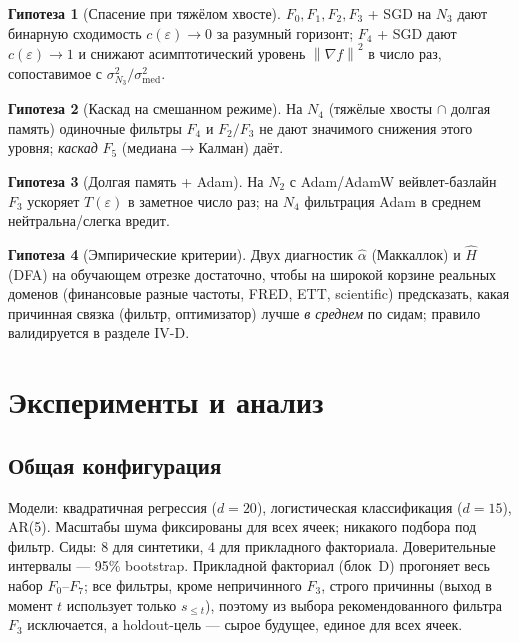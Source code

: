 \documentclass[conference]{IEEEtran}
\theoremstyle{plain}
\theoremstyle{definition}
\newtheorem{hypothesis}{Гипотеза}
\newcommand{\norm}[1]{\left\lVert#1\right\rVert}
\begin{document}
\begin{hypothesis}[Спасение при тяжёлом хвосте]\label{hyp:rescue}
$F_0,F_1,F_2,F_3$ + SGD на $N_3$ дают бинарную сходимость
$c(\varepsilon)\to0$ за разумный горизонт; $F_4$ + SGD дают
$c(\varepsilon)\to1$ и снижают асимптотический уровень $\norm{\nabla f}^2$ в число раз,
сопоставимое с $\sigma_{N_3}^2/\sigma_{\mathrm{med}}^2$.
\end{hypothesis}

\begin{hypothesis}[Каскад на смешанном режиме]\label{hyp:cascade}
На $N_4$ (тяжёлые хвосты $\cap$ долгая память) одиночные фильтры $F_4$
и $F_2/F_3$ не дают значимого снижения этого уровня; \emph{каскад} $F_5$
(медиана$\to$Калман) даёт.
\end{hypothesis}

\begin{hypothesis}[Долгая память + Adam]\label{hyp:adam}
На $N_2$ с Adam/AdamW вейвлет-базлайн $F_3$ ускоряет $T(\varepsilon)$ в
заметное число раз; на $N_4$ фильтрация Adam в среднем
нейтральна/слегка вредит.
\end{hypothesis}

\begin{hypothesis}[Эмпирические критерии]\label{hyp:rule}
Двух диагностик $\hat\alpha$ (Маккаллок) и $\hat H$ (DFA) на обучающем
отрезке достаточно, чтобы на широкой корзине реальных доменов
(финансовые разные частоты, FRED, ETT, scientific) предсказать, какая
причинная связка (фильтр, оптимизатор) лучше \emph{в среднем} по
сидам; правило валидируется в разделе IV-D.
\end{hypothesis}

\section{Эксперименты и анализ}

\subsection{Общая конфигурация}
Модели: квадратичная регрессия ($d{=}20$), логистическая классификация
($d{=}15$), AR(5). Масштабы шума фиксированы для всех ячеек; никакого
подбора под фильтр. Сиды: $8$ для синтетики, $4$ для прикладного
факториала. Доверительные интервалы --- 95\% bootstrap. Прикладной
факториал (блок~D) прогоняет весь набор $F_0$--$F_7$; все фильтры, кроме
непричинного $F_3$, строго причинны (выход в момент $t$ использует только
$s_{\le t}$), поэтому из выбора рекомендованного фильтра $F_3$
исключается, а holdout-цель --- сырое будущее, единое для всех ячеек.
\end{document}

